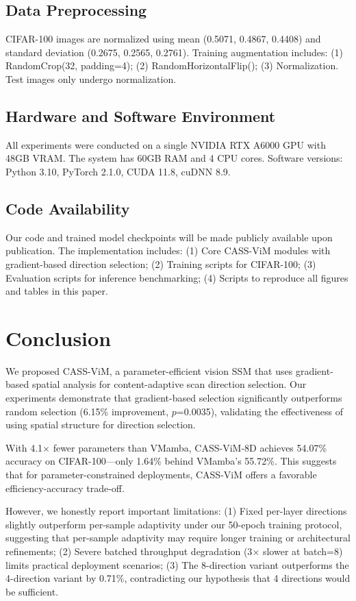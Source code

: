 \documentclass{article}
\begin{document}
\subsection{Data Preprocessing}

CIFAR-100 images are normalized using mean (0.5071, 0.4867, 0.4408) and standard deviation (0.2675, 0.2565, 0.2761). Training augmentation includes: (1) RandomCrop(32, padding=4); (2) RandomHorizontalFlip(); (3) Normalization. Test images only undergo normalization.

\subsection{Hardware and Software Environment}

All experiments were conducted on a single NVIDIA RTX A6000 GPU with 48GB VRAM. The system has 60GB RAM and 4 CPU cores. Software versions: Python 3.10, PyTorch 2.1.0, CUDA 11.8, cuDNN 8.9.

\subsection{Code Availability}

Our code and trained model checkpoints will be made publicly available upon publication. The implementation includes: (1) Core CASS-ViM modules with gradient-based direction selection; (2) Training scripts for CIFAR-100; (3) Evaluation scripts for inference benchmarking; (4) Scripts to reproduce all figures and tables in this paper.

\section{Conclusion}
\label{sec:conclusion}

We proposed CASS-ViM, a parameter-efficient vision SSM that uses gradient-based spatial analysis for content-adaptive scan direction selection. Our experiments demonstrate that gradient-based selection significantly outperforms random selection (6.15\% improvement, $p$=0.0035), validating the effectiveness of using spatial structure for direction selection.

With 4.1$\times$ fewer parameters than VMamba, CASS-ViM-8D achieves 54.07\% accuracy on CIFAR-100---only 1.64\% behind VMamba's 55.72\%. This suggests that for parameter-constrained deployments, CASS-ViM offers a favorable efficiency-accuracy trade-off.

However, we honestly report important limitations: (1) Fixed per-layer directions slightly outperform per-sample adaptivity under our 50-epoch training protocol, suggesting that per-sample adaptivity may require longer training or architectural refinements; (2) Severe batched throughput degradation (3$\times$ slower at batch=8) limits practical deployment scenarios; (3) The 8-direction variant outperforms the 4-direction variant by 0.71\%, contradicting our hypothesis that 4 directions would be sufficient.
\end{document}
